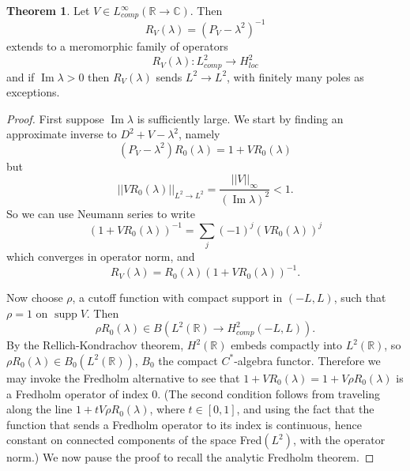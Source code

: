 \documentclass[12pt]{report}
\newcommand{\RR}{\mathbb{R}}
\newcommand{\CC}{\mathbb{C}}
\newcommand{\supp}{\operatorname{supp}}
\renewcommand{\Im}{\operatorname{Im}}
\theoremstyle{definition}
\newtheorem{theorem}{Theorem}[chapter]
\begin{document}
\begin{theorem}
Let $V \in L^\infty_{comp}(\RR \to \CC)$. Then
$$R_V(\lambda) = (P_V - \lambda^2)^{-1}$$
extends to a meromorphic family of operators
$$R_V(\lambda): L^2_{comp} \to H^2_{loc}$$
and if $\Im \lambda > 0$ then $R_V(\lambda)$ sends $L^2 \to L^2$, with finitely many poles as exceptions.
\end{theorem}
\begin{proof}
First suppose $\Im \lambda$ is sufficiently large. We start by finding an approximate inverse to $D^2 + V - \lambda^2$, namely
$$(P_V - \lambda^2)R_0(\lambda) = 1 + VR_0(\lambda)$$
but
$$||VR_0(\lambda)||_{L^2 \to L^2} = \frac{||V||_\infty}{(\Im \lambda)^2} < 1.$$
So we can use Neumann series to write
$$(1 + VR_0(\lambda))^{-1} = \sum_j (-1)^j (VR_0(\lambda))^j$$
which converges in operator norm, and
$$R_V(\lambda) = R_0(\lambda)(1 + VR_0(\lambda))^{-1}.$$

Now choose $\rho$, a cutoff function with compact support in $(-L, L)$, such that $\rho = 1$ on $\supp V$.
Then
$$\rho R_0(\lambda) \in B(L^2(\RR) \to H_{comp}^2(-L, L)).$$
By the Rellich-Kondrachov theorem, $H^2(\RR)$ embeds compactly into $L^2(\RR)$, so $\rho R_0(\lambda) \in B_0(L^2(\RR))$, $B_0$ the compact $C^*$-algebra functor.
Therefore we may invoke the Fredholm alternative to see that $1 + VR_0(\lambda) = 1 + V \rho R_0(\lambda)$ is a Fredholm operator of index $0$.
(The second condition follows from traveling along the line $1 + t V\rho R_0(\lambda)$, where $t \in [0, 1]$, and using the fact that the function that sends a Fredholm operator to its index is continuous, hence constant on connected components of the space Fred$(L^2)$, with the operator norm.)
We now pause the proof to recall the analytic Fredholm theorem.
\end{proof}
\end{document}
